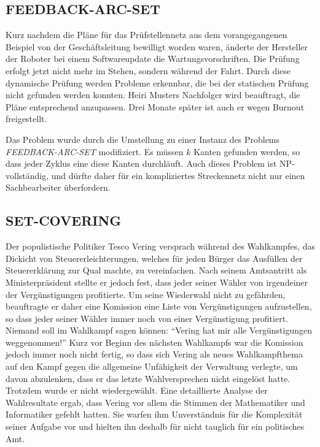 \subsection{FEEDBACK-ARC-SET}
Kurz nachdem die Pläne für das Prüfstellennetz aus dem vorangegangenen
Beispiel von der Geschäftsleitung bewilligt worden waren, änderte
der Hersteller der Roboter bei einem Softwareupdate die Wartungsvorschriften.
Die Prüfung erfolgt jetzt nicht mehr im Stehen, sondern während der
Fahrt.
Durch diese dynamische Prüfung werden Probleme erkennbar, die bei der
statischen Prüfung nicht gefunden werden konnten. Heiri Musters
Nachfolger wird beauftragt, die Pläne entsprechend anzupassen.
Drei Monate später ist auch er wegen Burnout freigestellt.

\medskip

Das Problem wurde durch die Umstellung zu einer Instanz des
Problems {\it FEEDBACK-ARC-SET} modifiziert.
Es müssen $k$ Kanten gefunden werden, so dass jeder Zyklus eine
diese Kanten durchläuft. Auch dieses Problem ist NP-vollständig,
und dürfte daher für ein kompliziertes Streckennetz
nicht nur einen Sachbearbeiter überfordern.

\subsection{SET-COVERING}
Der populistische Politiker Tesco Vering versprach während des
Wahlkampfes, das Dickicht von Steuererleichterungen, welches
für jeden Bürger das Ausfüllen der Steuererklärung zur Qual
machte, zu vereinfachen.
Nach seinem Amtsantritt als Ministerpräsident 
stellte er jedoch fest, dass jeder seiner Wähler von irgendeiner
der Vergünstigungen profitierte. Um seine Wiederwahl nicht
zu gefährden, beauftragte er daher eine Komission eine Liste
von Vergünstigungen aufzustellen, so dass jeder seiner Wähler
immer noch von einer Vergünstigung profitiert. Niemand soll im
Wahlkampf sagen können: ``Vering hat mir alle Vergünstigungen weggenommen!''
Kurz vor Beginn des nächsten Wahlkampfs war die Komission jedoch
immer noch nicht fertig, so dass sich Vering als neues Wahlkampfthema
auf den Kampf gegen die allgemeine Unfähigkeit der Verwaltung verlegte,
um davon
abzulenken, dass er das letzte Wahlversprechen nicht eingelöst hatte.
Trotzdem wurde er nicht wiedergewählt. Eine detaillierte Analyse der
Wahlresultate ergab, dass Vering vor allem die Stimmen der Mathematiker und
Informatiker gefehlt hatten.
Sie warfen ihm Unverständnis für die Komplexität seiner Aufgabe vor und 
hielten ihn deshalb für nicht tauglich für ein politisches Amt.


